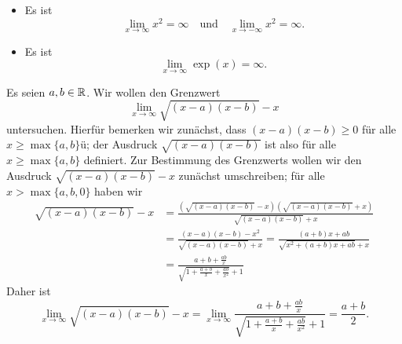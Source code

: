 \documentclass[a4paper,10pt]{article}
\begin{document}
\begin{bsp}
 \begin{itemize}
  \item
   Es ist
   \[
    \lim_{x \to \infty} x^2 = \infty
    \quad
    \text{und}
    \quad
    \lim_{x \to -\infty} x^2 = \infty.
   \]
  \item
   Es ist
   \[
    \lim_{x \to \infty} \exp(x) = \infty.
   \]
 \end{itemize}
\end{bsp}

\begin{bsp}
 Es seien $a,b \in \mathbb{R}$. Wir wollen den Grenzwert 
 \[
  \lim_{x \to \infty} \sqrt{(x-a)(x-b)}-x
 \]
 untersuchen. Hierfür bemerken wir zunächst, dass $(x-a)(x-b) \geq 0$ für alle \mbox{$x \geq \max\{a,b\}$}ü; der Ausdruck $\sqrt{(x-a)(x-b)}$ ist also für alle $x \geq \max\{a,b\}$ definiert. Zur Bestimmung des Grenzwerts wollen wir den Ausdruck $\sqrt{(x-a)(x-b)}-x$ zunächst umschreiben; für alle $x > \max\{a,b,0\}$ haben wir
 \begin{align*}
  \sqrt{(x-a)(x-b)}-x
  &= \frac{(\sqrt{(x-a)(x-b)}-x)(\sqrt{(x-a)(x-b)}+x)}{\sqrt{(x-a)(x-b)}+x} \\
  &= \frac{(x-a)(x-b)-x^2}{\sqrt{(x-a)(x-b)}+x}
  = \frac{(a+b)x + ab}{\sqrt{x^2+(a+b)x+ab}+x} \\
  &= \frac{a+b+\frac{ab}{x}}{\sqrt{1+\frac{a+b}{x}+\frac{ab}{x^2}}+1}
 \end{align*}
 Daher ist
 \[
  \lim_{x \to \infty} \sqrt{(x-a)(x-b)}-x
  = \lim_{x \to \infty} \frac{a+b+\frac{ab}{x}}{\sqrt{1+\frac{a+b}{x}+\frac{ab}{x^2}}+1}
  = \frac{a+b}{2}.
 \]
\end{bsp}
\end{document}

